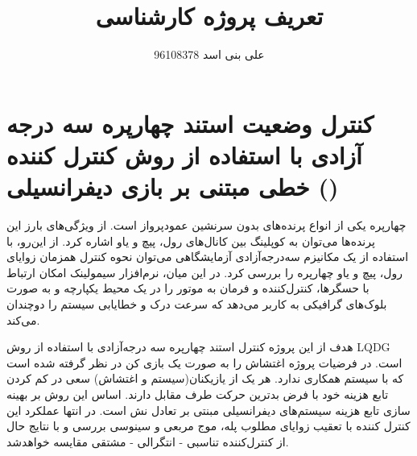 \documentclass[12 pt]{article}
\title{تعریف پروژه کارشناسی}
\author{علی بنی اسد 96108378}
\begin{document}
	\maketitle
	\section*{کنترل وضعیت استند چهارپره
		 سه درجه آزادی 
		با استفاده از روش کنترل کننده خطی مبتنی بر بازی دیفرانسیلی
()	}





چهارپره یکی از انواع پرنده‌های بدون سرنشین عمودپرواز است. از ویژگی‌های بارز این پرنده‌ها می‌توان به کوپلینگ بین کانال‌های رول، پیچ و یاو اشاره کرد. از این‌رو، با استفاده از یک مکانیزم ‌سه‌درجه‌آزادی آزمایشگاهی می‌توان نحوه کنترل همزمان زوایای رول، پیچ و یاو چهارپره را بررسی کرد. در این میان، نرم‌افزار‌ سیمولینک امکان ارتباط با حسگرها، کنترل‌کننده و فرمان به موتور را در یک محیط یکپارچه و به ‌صورت بلوک‌های گرافیکی به کاربر می‌دهد که سرعت درک و خطا‌یابی سیستم را دوچندان می‌کند.



هدف از این پروژه کنترل استند چهارپره سه درجه‌آزادی با استفاده از روش LQDG است. در فرضیات پروژه اغتشاش را به صورت یک بازی کن در نظر گرفته شده است که با سیستم همکاری ندارد. هر یک از یازیکنان(سیستم و اغتشاش) سعی در کم کردن تابع هزینه خود با فرض بدترین حرکت طرف مقابل دارند. اساس این روش بر بهینه سازی تابع هزینه سیستم‌های دیفرانسیلی مبنتی بر تعادل نش 
است. در انتها عملکرد این کنترل کننده با تعقیب زوایای مطلوب پله، موج مربعی و سینوسی بررسی و با نتایج حال از کنترل‌کننده  تناسبی - انتگرالی -
مشتقی مقایسه خواهد‌شد.
\end{document}

